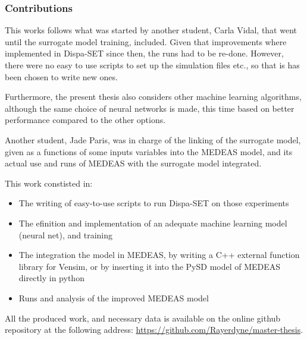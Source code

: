 


\subsubsection{Contributions}

This works follows what was started by another student, Carla Vidal, that went until the surrogate model training, included. Given that improvements where implemented in Dispa-SET since then, the runs had to be re-done. However, there were no easy to use scripts to set up the simulation files etc., so that is has been chosen to write new ones.

Furthermore, the present thesis also considers other machine learning algorithms, although the same choice of neural networks is made, this time based on better performance compared to the other options.

Another student, Jade Paris, was in charge of the linking of the surrogate model, given as a functions of some inputs variables into the MEDEAS model, and its actual use and runs of MEDEAS with the surrogate model integrated.

This work constisted in:
\begin{itemize}
    \item The writing of easy-to-use scripts to run Dispa-SET on those experiments
    \item The efinition and implementation of an adequate machine learning model (neural net), and training
    \item The integration the model in MEDEAS, by writing a C++ external function library for Vensim, or by inserting it into the PySD model of MEDEAS directly in python
    \item Runs and analysis of the improved MEDEAS model
\end{itemize}

All the produced work, and necessary data is available on the online github repository at the following address: \href{https://github.com/Rayerdyne/master-thesis}{https://github.com/Rayerdyne/master-thesis}.

